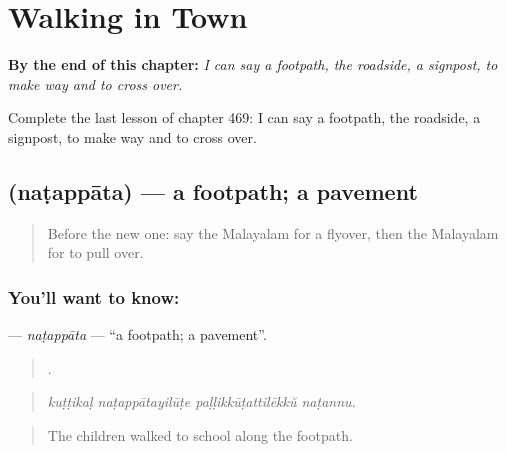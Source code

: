 
\chapter{Walking in Town}
\label{ch:ml-walking-in-town}

\begin{chapteropening}
\textbf{By the end of this chapter:} \emph{I can say a footpath, the roadside, a signpost, to make way and to cross over.}

Complete the last lesson of chapter 469: I can say a footpath, the roadside, a signpost, to make way and to cross over.
\end{chapteropening}

\section[\texorpdfstring{\ml{നടപ്പാത} (naṭappāta)}{നടപ്പാത (naṭappāta)}]{ (naṭappāta) — a footpath; a pavement}

\label{lesson:ML-C469-natappata}



\begin{quote}
Before the new one: say the Malayalam for a flyover, then the Malayalam for to pull over.
\end{quote}

\subsection*{You'll want to know: }
\textbf{} — \emph{naṭappāta} — \textquotedblleft{}a footpath; a pavement\textquotedblright{}.

\begin{quote}
   .
\end{quote}

\begin{quote}
\emph{kuṭṭikaḷ naṭappātayilūṭe paḷḷikkūṭattilēkkŭ naṭannu.}
\end{quote}

\begin{quote}
The children walked to school along the footpath.
\end{quote}

